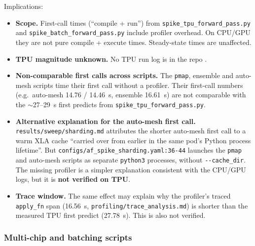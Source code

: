 Implications:
\begin{itemize}
  \item \textbf{Scope.} First-call times (``compile + run'') from \texttt{spike\_\allowbreak{}tpu\_\allowbreak{}forward\_\allowbreak{}pass.py}
    and \texttt{spike\_\allowbreak{}batch\_\allowbreak{}forward\_\allowbreak{}pass.py} include profiler overhead. On CPU/GPU they
    are not pure compile + execute times. Steady-state times are unaffected.
  \item \textbf{TPU magnitude unknown.} No TPU run log is in the repo .
  \item \textbf{Non-comparable first calls across scripts.} The \texttt{pmap}, ensemble and auto-mesh
    scripts time their first call without a profiler. Their first-call numbers
    (e.g.\ auto-mesh 14.76 / 14.46~s, ensemble 16.61~s) are not comparable with the
    $\sim$27--29~s first predicts from \texttt{spike\_\allowbreak{}tpu\_\allowbreak{}forward\_\allowbreak{}pass.py}.
  \item \textbf{Alternative explanation for the auto-mesh first call.} \texttt{results/\allowbreak{}sweep/\allowbreak{}sharding.md} attributes
    the shorter auto-mesh first call to a warm XLA cache ``carried over from earlier in
    the same pod's Python process lifetime''. But \texttt{configs/\allowbreak{}af\_\allowbreak{}spike\_\allowbreak{}sharding.yaml:36-44}
    launches the \texttt{pmap} and auto-mesh scripts as separate \texttt{python3} processes, without
    \texttt{-{}-cache\_dir}. The missing profiler is a simpler explanation consistent with the
    CPU/GPU logs, but it is \textbf{not verified on TPU}.
  \item \textbf{Trace window.} The same effect may explain why the profiler's traced
    \texttt{apply\_fn} span (16.56~s, \texttt{profiling/\allowbreak{}trace\_\allowbreak{}analysis.md}) is shorter than the
    measured TPU first predict (27.78~s). This is also not verified.
\end{itemize}

\subsubsection{Multi-chip and batching scripts}
\label{sec:meth-timing-multichip}

